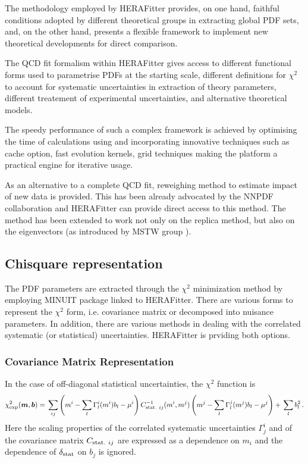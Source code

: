
The methodology employed by HERAFitter provides,  
 on one hand, faithful conditions adopted by different theoretical 
groups in extracting global PDF sets, and, on the other hand,  presents
a flexible framework to implement new theoretical developments for 
direct comparison.

The QCD fit formalism within HERAFitter gives access to different functional 
forms used to parametrise PDFs at the starting scale, different definitions for $\chi^2$ to account for systematic uncertainties in extraction of theory parameters, different treatement of experimental uncertainties, and alternative theoretical models. 

The speedy performance of such a complex framework is achieved by optimising the time of calculations using and incorporating innovative techniques such as cache option, fast evolution kernels, grid techniques making the platform a practical engine for iterative usage.

As an alternative to a complete QCD fit, reweighing method to estimate impact of new data is provided. This has been already advocated by the NNPDF collaboration \cite{PDFreplicareweighing} and HERAFitter can provide direct access to this method. The method has been extended to work not only on the replica method, but also on the eigenvectors (as introduced by MSTW group \cite{PDFeigreweighing}).





\subsection{Chisquare representation}

The PDF parameters are extracted through the $\chi^2$ minimization method by 
employing MINUIT package linked to HERAFitter. There are various forms to represent the $\chi^2$ form, i.e. covariance matrix or decomposed into nuisance parameters. In addition, there are various methods in dealing with the correlated systematic (or statistical) uncertainties.
HERAFitter is prviding both options.

\subsubsection{Covariance Matrix Representation}

In the case of off-diagonal statistical uncertainties, the $\chi^2$ function
is
\begin{equation} \label{eq:chi2gen}
\chi^2_{\rm exp} (\boldsymbol{m},\boldsymbol{b}) = \\
\sum_{ij} \left ( m^i - \sum_l \Gamma^i_l(m^i)b_l - \mu^i \right)
  C^{-1}_{{\rm stat.}~ij}(m^i,m^j) \left(  m^j - \sum_l \Gamma^j_l(m^j)b_l - \mu^j \right)  + \\  
\sum_l b^2_l \,.
\end{equation}
Here the scaling properties of the correlated systematic uncertainties 
$\Gamma^i_j$ and
of the covariance matrix $C_{{\rm stat.}~ij}$ are expressed as a dependence
on $m_i$ and the dependence of $\delta_{\rm stat}$ on $b_j$ is ignored.

